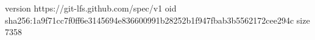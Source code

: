 version https://git-lfs.github.com/spec/v1
oid sha256:1a9f71cc7f0ff6e3145694e836600991b28252b1f947fbab3b5562172cee294c
size 7358
